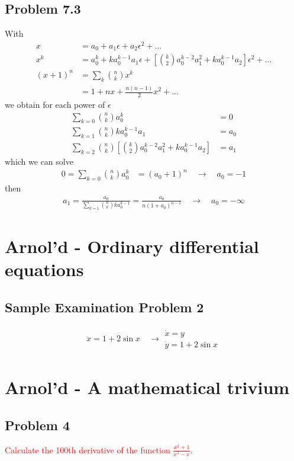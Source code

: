 \documentclass[10pt,a4paper]{book}
\theoremstyle{definition}
\begin{document}
\subsection{Problem 7.3}
With
\begin{align}
x&=a_0+a_1\epsilon+a_2\epsilon^2+...\\
x^k&=a_0^k+ka_0^{k-1}a_1\epsilon+\left[\binom{k}{2}a_0^{k-2}a_1^2+ka_0^{k-1}a_2\right]\epsilon^2+...\\
(x+1)^n
&=\sum_k\binom{n}{k}x^k\\
&=1+nx+\frac{n(n-1)}{2}x^2+...
\end{align}
we obtain for each power of $\epsilon$
\begin{align}
\sum_{k=0}\binom{n}{k}a_0^k&=0\\
\sum_{k=1}\binom{n}{k}ka_0^{k-1}a_1&=a_0\\
\sum_{k=2}\binom{n}{k}\left[\binom{k}{2}a_0^{k-2}a_1^2+ka_0^{k-1}a_2\right]&=a_1
\end{align}
which we can solve
\begin{align*}
0=\sum_{k=0}\binom{n}{k}a_0^k&=(a_0+1)^n\quad\rightarrow\quad a_0=-1
\end{align*}
then
\begin{align}
a_1=\frac{a_0}{\sum_{k=1}\binom{n}{k}ka_0^{k-1}}=\frac{a_0}{n(1+a_0)^{n-1}}\quad\rightarrow\quad a_0=-\infty
\end{align}




\section{{\sc Arnol'd} - Ordinary differential equations}
\subsection{Sample Examination Problem 2}
\begin{align}
\ddot x=1+2\sin x\quad\rightarrow
\begin{array}{l}
\dot x=y\\
\dot y=1+2\sin x
\end{array}
\end{align}

\section{{\sc Arnol'd} - A mathematical trivium}
\subsection{Problem 4}
\textcolor{red}{Calculate the 100th derivative of the function $\frac{x^2+1}{x^3-x}$.}
\end{document}
